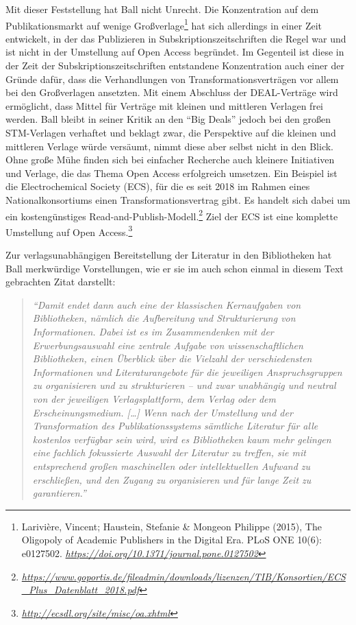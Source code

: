 \documentclass[a4paper,
fontsize=11pt,
oneside,
numbers=noperiodatend,
parskip=half-,
bibliography=totoc,
final
]{scrartcl}
\begin{document}
Mit dieser Feststellung hat Ball nicht Unrecht. Die Konzentration auf
dem Publikationsmarkt auf wenige Großverlage\footnote{Larivière,
  Vincent; Haustein, Stefanie \& Mongeon Philippe (2015), The Oligopoly
  of Academic Publishers in the Digital Era. PLoS ONE 10(6): e0127502.
  \href{https://doi.org/10.1371/journal.pone.0127502}{\emph{https://doi.org/10.1371/journal.pone.0127502}}}
hat sich allerdings in einer Zeit entwickelt, in der das Publizieren in
Subskriptionszeitschriften die Regel war und ist nicht in der Umstellung
auf Open Access begründet. Im Gegenteil ist diese in der Zeit der
Subskriptionszeitschriften entstandene Konzentration auch einer der
Gründe dafür, dass die Verhandlungen von Transformationsverträgen vor
allem bei den Großverlagen ansetzten. Mit einem Abschluss der
DEAL-Verträge wird ermöglicht, dass Mittel für Verträge mit kleinen und
mittleren Verlagen frei werden. Ball bleibt in seiner Kritik an den
\enquote{Big Deals} jedoch bei den großen STM-Verlagen verhaftet und
beklagt zwar, die Perspektive auf die kleinen und mittleren Verlage
würde versäumt, nimmt diese aber selbst nicht in den Blick. Ohne große
Mühe finden sich bei einfacher Recherche auch kleinere Initiativen und
Verlage, die das Thema Open Access erfolgreich umsetzen. Ein Beispiel
ist die Electrochemical Society (ECS), für die es seit 2018 im Rahmen
eines Nationalkonsortiums einen Transformationsvertrag gibt. Es handelt
sich dabei um ein kostengünstiges Read-and-Publish-Modell.\footnote{\href{https://www.goportis.de/fileadmin/downloads/lizenzen/TIB/Konsortien/ECS_Plus_Datenblatt_2018.pdf}{\emph{https://www.goportis.de/fileadmin/downloads/lizenzen/TIB/Konsortien/ECS\_Plus\_Datenblatt\_2018.pdf}}}
Ziel der ECS ist eine komplette Umstellung auf Open Access.\footnote{\href{http://ecsdl.org/site/misc/oa.xhtml}{\emph{http://ecsdl.org/site/misc/oa.xhtml}}}

Zur verlagsunabhängigen Bereitstellung der Literatur in den Bibliotheken
hat Ball merkwürdige Vorstellungen, wie er sie im auch schon einmal in
diesem Text gebrachten Zitat darstellt:

\begin{quote}
\emph{\enquote{Damit endet dann auch eine der klassischen Kernaufgaben
von Bibliotheken, nämlich die Aufbereitung und Strukturierung von
Informationen. Dabei ist es im Zusammendenken mit der Erwerbungsauswahl
eine zentrale Aufgabe von wissenschaftlichen Bibliotheken, einen
Überblick über die Vielzahl der verschiedensten Informationen und
Literaturangebote für die jeweiligen Anspruchsgruppen zu organisieren
und zu strukturieren -- und zwar unabhängig und neutral von der
jeweiligen Verlagsplattform, dem Verlag oder dem Erscheinungsmedium.
{[}\ldots{}{]} Wenn nach der Umstellung und der Transformation des
Publikationssystems sämtliche Literatur für alle kostenlos verfügbar
sein wird, wird es Bibliotheken kaum mehr gelingen eine fachlich
fokussierte Auswahl der Literatur zu treffen, sie mit entsprechend
großen maschinellen oder intellektuellen Aufwand zu erschließen, und den
Zugang zu organisieren und für lange Zeit zu garantieren.}}
\end{quote}
\end{document}
